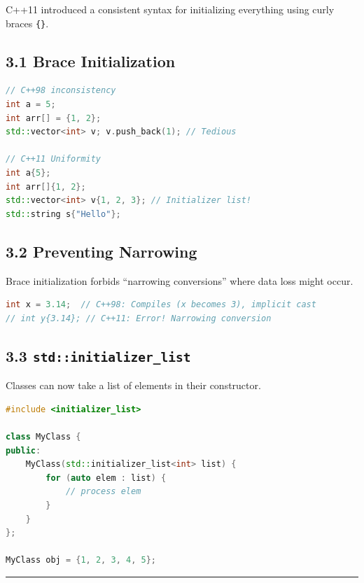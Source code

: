 C++11 introduced a consistent syntax for initializing everything using
curly braces \passthrough{\lstinline!\{\}!}.

\hypertarget{brace-initialization}{%
\subsection{3.1 Brace Initialization}\label{brace-initialization}}

\begin{lstlisting}[language={C++}]
// C++98 inconsistency
int a = 5;
int arr[] = {1, 2};
std::vector<int> v; v.push_back(1); // Tedious

// C++11 Uniformity
int a{5};
int arr[]{1, 2};
std::vector<int> v{1, 2, 3}; // Initializer list!
std::string s{"Hello"};
\end{lstlisting}

\hypertarget{preventing-narrowing}{%
\subsection{3.2 Preventing Narrowing}\label{preventing-narrowing}}

Brace initialization forbids ``narrowing conversions'' where data loss
might occur.

\begin{lstlisting}[language={C++}]
int x = 3.14;  // C++98: Compiles (x becomes 3), implicit cast
// int y{3.14}; // C++11: Error! Narrowing conversion
\end{lstlisting}

\hypertarget{stdinitializer_list}{%
\subsection{\texorpdfstring{3.3
\texttt{std::initializer\_list}}{3.3 std::initializer\_list}}\label{stdinitializer_list}}

Classes can now take a list of elements in their constructor.

\begin{lstlisting}[language={C++}]
#include <initializer_list>

class MyClass {
public:
    MyClass(std::initializer_list<int> list) {
        for (auto elem : list) {
            // process elem
        }
    }
};

MyClass obj = {1, 2, 3, 4, 5};
\end{lstlisting}

\begin{center}\rule{0.5\linewidth}{0.5pt}\end{center}


